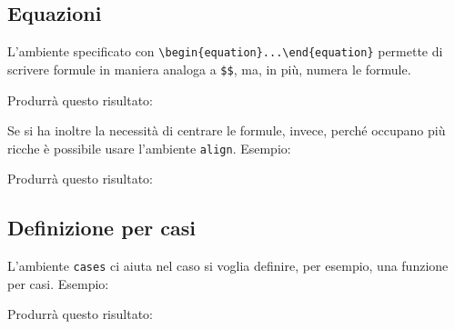 \subsection{Equazioni}
L'ambiente specificato con \verb!\begin{equation}...\end{equation}! permette 
di scrivere formule in maniera analoga a \verb!$$!, ma, in più, numera le 
formule.

Produrrà questo risultato:\\

\par
Se si ha inoltre la necessità di centrare le formule, invece, perché occupano 
più ricche è possibile usare l'ambiente \verb!align!. Esempio:

Produrrà questo risultato:\\


\subsection{Definizione per casi}
L'ambiente \verb!cases! ci aiuta nel caso si voglia definire, per esempio, una 
funzione per casi. Esempio:

Produrrà questo risultato:\\
